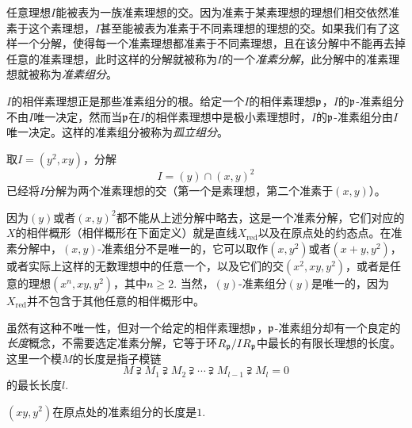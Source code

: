 任意理想$I$能被表为一族准素理想的交。因为准素于某素理想的理想们相交依然准素于这个素理想，$I$甚至能被表为准素于不同素理想的理想的交。如果我们有了这样一个分解，使得每一个准素理想都准素于不同素理想，且在该分解中不能再去掉任意的准素理想，此时这样的分解就被称为$I$的一个\textit{准素分解}，此分解中的准素理想就被称为\textit{准素组分}。

$I$的相伴素理想正是那些准素组分的根。给定一个$I$的相伴素理想$\mathfrak{p}$，$I$的$\mathfrak{p}$-准素组分不由$I$唯一决定，然而当$\mathfrak{p}$在$I$的相伴素理想中是极小素理想时，$I$的$\mathfrak{p}$-准素组分由$I$唯一决定。这样的准素组分被称为\textit{孤立组分}。

\begin{exe}
	取$I=(y^2,xy)$，分解
	\[
	I=(y)\cap (x,y)^2
	\]
	已经将$I$分解为两个准素理想的交（第一个是素理想，第二个准素于$(x,y)$）。
\end{exe}

因为$(y)$或者$(x,y)^2$都不能从上述分解中略去，这是一个准素分解，它们对应的$X$的相伴概形（相伴概形在下面定义）就是直线$X_{\mathrm{red}}$以及在原点处的约态点。在准素分解中，$(x,y)$\hyp 准素组分不是唯一的，它可以取作$(x,y^2)$或者$(x+y,y^2)$，或者实际上这样的无数理想中的任意一个，以及它们的交$(x^2,xy,y^2)$，或者是任意的理想$(x^n,xy,y^2)$，其中$n\geq 2$. 当然，$(y)$\hyp 准素组分$(y)$是唯一的，因为$X_{\mathrm{red}}$并不包含于其他任意的相伴概形中。

虽然有这种不唯一性，但对一个给定的相伴素理想$\mathfrak{p}$，$\mathfrak{p}$-准素组分却有一个良定的\textit{长度}概念，不需要选定准素分解，它等于环$R_{\mathfrak{p}}/IR_{\mathfrak{p}}$中最长的有限长理想的长度。这里一个模$M$的长度是指子模链
\[
	M\supsetneqq M_1 \supsetneqq M_2 \supsetneqq \cdots \supsetneqq M_{l-1} \supsetneqq M_l=0
\]
的最长长度$l$.

\begin{exe}
	$(xy,y^2)$在原点处的准素组分的长度是$1$.
\end{exe}

